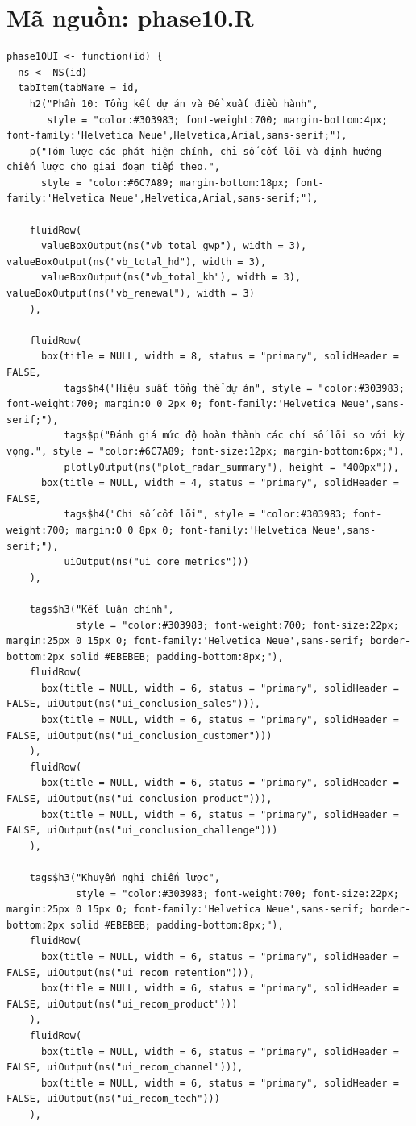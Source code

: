 \documentclass[12pt, a4paper]{article}
\begin{document}
\section{Mã nguồn: phase10.R}
\begin{lstlisting}
phase10UI <- function(id) {
  ns <- NS(id)
  tabItem(tabName = id,
    h2("Phần 10: Tổng kết dự án và Đề xuất điều hành",
       style = "color:#303983; font-weight:700; margin-bottom:4px; font-family:'Helvetica Neue',Helvetica,Arial,sans-serif;"),
    p("Tóm lược các phát hiện chính, chỉ số cốt lõi và định hướng chiến lược cho giai đoạn tiếp theo.",
      style = "color:#6C7A89; margin-bottom:18px; font-family:'Helvetica Neue',Helvetica,Arial,sans-serif;"),

    fluidRow(
      valueBoxOutput(ns("vb_total_gwp"), width = 3), valueBoxOutput(ns("vb_total_hd"), width = 3),
      valueBoxOutput(ns("vb_total_kh"), width = 3), valueBoxOutput(ns("vb_renewal"), width = 3)
    ),

    fluidRow(
      box(title = NULL, width = 8, status = "primary", solidHeader = FALSE,
          tags$h4("Hiệu suất tổng thể dự án", style = "color:#303983; font-weight:700; margin:0 0 2px 0; font-family:'Helvetica Neue',sans-serif;"),
          tags$p("Đánh giá mức độ hoàn thành các chỉ số lõi so với kỳ vọng.", style = "color:#6C7A89; font-size:12px; margin-bottom:6px;"),
          plotlyOutput(ns("plot_radar_summary"), height = "400px")),
      box(title = NULL, width = 4, status = "primary", solidHeader = FALSE,
          tags$h4("Chỉ số cốt lõi", style = "color:#303983; font-weight:700; margin:0 0 8px 0; font-family:'Helvetica Neue',sans-serif;"),
          uiOutput(ns("ui_core_metrics")))
    ),

    tags$h3("Kết luận chính",
            style = "color:#303983; font-weight:700; font-size:22px; margin:25px 0 15px 0; font-family:'Helvetica Neue',sans-serif; border-bottom:2px solid #EBEBEB; padding-bottom:8px;"),
    fluidRow(
      box(title = NULL, width = 6, status = "primary", solidHeader = FALSE, uiOutput(ns("ui_conclusion_sales"))),
      box(title = NULL, width = 6, status = "primary", solidHeader = FALSE, uiOutput(ns("ui_conclusion_customer")))
    ),
    fluidRow(
      box(title = NULL, width = 6, status = "primary", solidHeader = FALSE, uiOutput(ns("ui_conclusion_product"))),
      box(title = NULL, width = 6, status = "primary", solidHeader = FALSE, uiOutput(ns("ui_conclusion_challenge")))
    ),

    tags$h3("Khuyến nghị chiến lược",
            style = "color:#303983; font-weight:700; font-size:22px; margin:25px 0 15px 0; font-family:'Helvetica Neue',sans-serif; border-bottom:2px solid #EBEBEB; padding-bottom:8px;"),
    fluidRow(
      box(title = NULL, width = 6, status = "primary", solidHeader = FALSE, uiOutput(ns("ui_recom_retention"))),
      box(title = NULL, width = 6, status = "primary", solidHeader = FALSE, uiOutput(ns("ui_recom_product")))
    ),
    fluidRow(
      box(title = NULL, width = 6, status = "primary", solidHeader = FALSE, uiOutput(ns("ui_recom_channel"))),
      box(title = NULL, width = 6, status = "primary", solidHeader = FALSE, uiOutput(ns("ui_recom_tech")))
    ),


\end{lstlisting}
\end{document}
